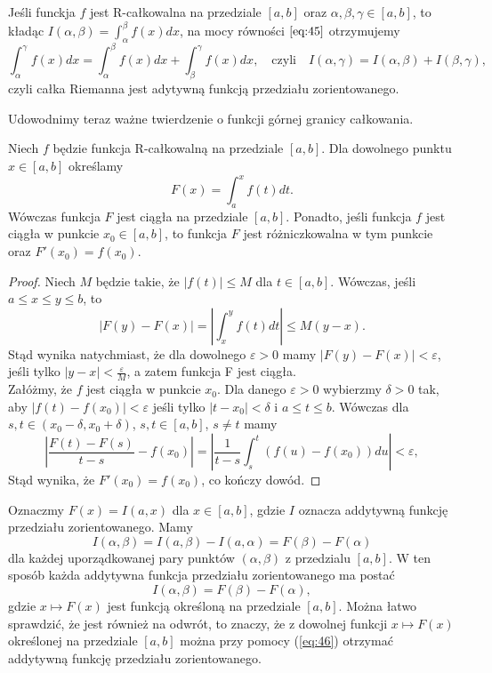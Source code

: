 \documentclass[leqno]{article}
\begin{document}
\begin{justify}
\begin{wniosek}
{
    Jeśli funckja $f$ jest R-całkowalna na przedziale $[a,b]$ oraz $\alpha, \beta, \gamma \in [a,b]$, to
    kładąc $I(\alpha, \beta) = \int_{\alpha}^{\beta}f(x)dx$, na mocy równości $\ref{eq:45}$ otrzymujemy
    \[
        \int_{\alpha}^{\gamma}f(x)dx = \int_{\alpha}^{\beta}f(x)dx + \int_{\beta}^{\gamma}f(x)dx,
        \quad \text{czyli} \quad I(\alpha, \gamma) = I(\alpha, \beta) + I(\beta, \gamma),
    \]
    czyli całka Riemanna jest adytywną funkcją przedziału zorientowanego.
}
\end{wniosek}

Udowodnimy teraz ważne twierdzenie o funkcji górnej granicy całkowania.

\begin{theorem}
{
    Niech $f$ będzie funkcja R-całkowalną na przedziale $[a,b]$. Dla dowolnego punktu
    $x \in [a,b]$ określamy
    \[
        F(x) = \int_{a}^{x}f(t)dt.
    \]
    Wówczas funkcja $F$ jest ciągła na przedziale $[a,b]$. Ponadto, jeśli funkcja $f$ jest ciągła w
    punkcie $x_0 \in [a,b]$, to funkcja $F$ jest różniczkowalna w tym punkcie oraz
    $F'(x_0) = f(x_0)$.
}
\end{theorem}

\begin{proof}
    Niech $M$ będzie takie, że $|f(t)| \leqslant M$ dla $t \in [a,b]$. 
    Wówczas, jeśli $a \leqslant x \leqslant y \leqslant b$, to
    \[
        |F(y) - F(x)| = \left|\int_{x}^{y}f(t)dt\right| \leqslant M(y - x).
    \]
    Stąd wynika natychmiast, że dla dowolnego $\varepsilon > 0$ mamy
    $|F(y) - F(x)|< \varepsilon$, jeśli tylko $|y-x| < \frac{\varepsilon}{M}$, 
    a zatem funkcja F jest ciągła. \\
    Załóżmy, że $f$ jest ciągła w punkcie $x_0$. Dla danego $\varepsilon > 0$ wybierzmy 
    $\delta > 0$ tak, aby $|f(t)-f(x_0)| < \varepsilon$ jeśli tylko $|t-x_0| < \delta$ i $a \leqslant t \leqslant b$.
    Wówczas dla $s,t \in (x_0 - \delta, x_0 + \delta)$, $s,t \in [a,b]$, $s \neq t$ mamy
    \[
        \left|\frac{F(t)-F(s)}{t-s} - f(x_0)\right| = \left|\frac{1}{t-s}\int_{s}^{t}(f(u)-f(x_0))du \right| < \varepsilon,
    \]
    Stąd wynika, że $F'(x_0) = f(x_0)$, co kończy dowód.
\end{proof}

Oznaczmy $F(x) = I(a, x)$ dla $x \in [a,b]$, gdzie $I$ oznacza addytywną funkcję przedziału zorientowanego. Mamy
\[
    I(\alpha, \beta) = I(a, \beta) - I(a, \alpha) = F(\beta) - F(\alpha)
\]
dla każdej uporządkowanej pary punktów $(\alpha, \beta)$ z przedzialu $[a,b]$.
W ten sposób każda addytywna funkcja przedziału zorientowanego ma postać
\begin{equation}\label{eq:46}
    I(\alpha, \beta) = F(\beta) - F(\alpha),
\end{equation}
gdzie $x \mapsto F(x)$ jest funkcją określoną na przedziale $[a,b]$. 
Można łatwo sprawdzić, że jest również na odwrót, to znaczy, że z dowolnej funkcji $x \mapsto F(x)$ określonej na przedziale $[a,b]$
można przy pomocy (\ref{eq:46}) otrzymać addytywną funkcję przedziału zorientowanego.


\end{justify}
\end{document}
